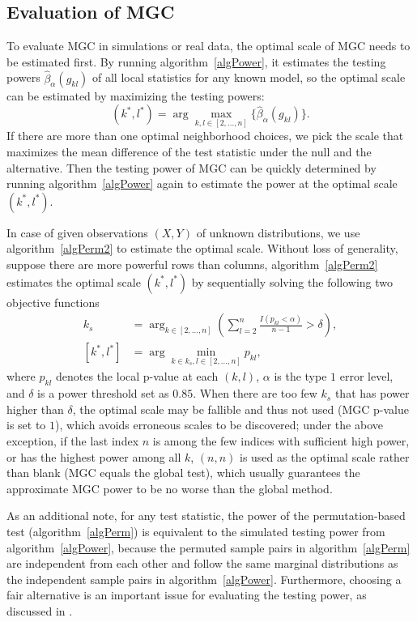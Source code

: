 \documentclass[11pt]{article}
\begin{document}
\subsection{Evaluation of MGC}
\label{appen:eval}

To evaluate MGC in simulations or real data, the optimal scale of MGC needs to be estimated first. By running algorithm~\ref{algPower}, it estimates the testing powers $\hat{\beta}_{\alpha}(g_{kl})$ of all local statistics for any known model, so the optimal scale can be estimated by maximizing the testing powers:
\begin{equation}
\label{power}
(k^{*},l^{*})=\arg\max_{k,l \in [2,\ldots,n] }\{\hat{\beta}_{\alpha}(g_{kl})\}.
\end{equation}
If there are more than one optimal neighborhood choices, we pick the scale that maximizes the mean difference of the test statistic under the null and the alternative. Then the testing power of MGC can be quickly determined by running algorithm~\ref{algPower} again to estimate the power at the optimal scale $(k^{*},l^{*})$. 

In case of given observations $(X,Y)$ of unknown distributions, we use algorithm~\ref{algPerm2} to estimate the optimal scale. Without loss of generality, suppose there are more powerful rows than columns, algorithm~\ref{algPerm2} estimates the optimal scale $(k^{*},l^{*})$ by sequentially solving the following two objective functions
\begin{align*}
\label{power}
k_{s}&=\arg_{k \in [2,\ldots,n] } (\sum_{l=2}^{n}\frac{I(p_{kl}<\alpha)}{n-1} > \delta),\\
[k^{*},l^{*}]&=\arg\min_{k \in k_{s}, l \in [2,\ldots,n] } p_{kl},
\end{align*}
where $p_{kl}$ denotes the local p-value at each $(k,l)$, $\alpha$ is the type $1$ error level, and $\delta$ is a power threshold set as $0.85$. When there are too few $k_{s}$ that has power higher than $\delta$, the optimal scale may be fallible and thus not used (MGC p-value is set to $1$), which avoids erroneous scales to be discovered; under the above exception, if the last index $n$ is among the few indices with sufficient high power, or has the highest power among all $k$, $(n,n)$ is used as the optimal scale rather than blank (MGC equals the global test), which usually guarantees the approximate MGC power to be no worse than the global method.

As an additional note, for any test statistic, the power of the permutation-based test (algorithm~\ref{algPerm}) is equivalent to the simulated testing power from algorithm~\ref{algPower}, because the permuted sample pairs in algorithm~\ref{algPerm} are independent from each other and follow the same marginal distributions as the independent sample pairs in algorithm~\ref{algPower}. Furthermore, choosing a fair alternative is an important issue for evaluating the testing power, as discussed in \cite{RamdasEtAl2015}.
\end{document}
